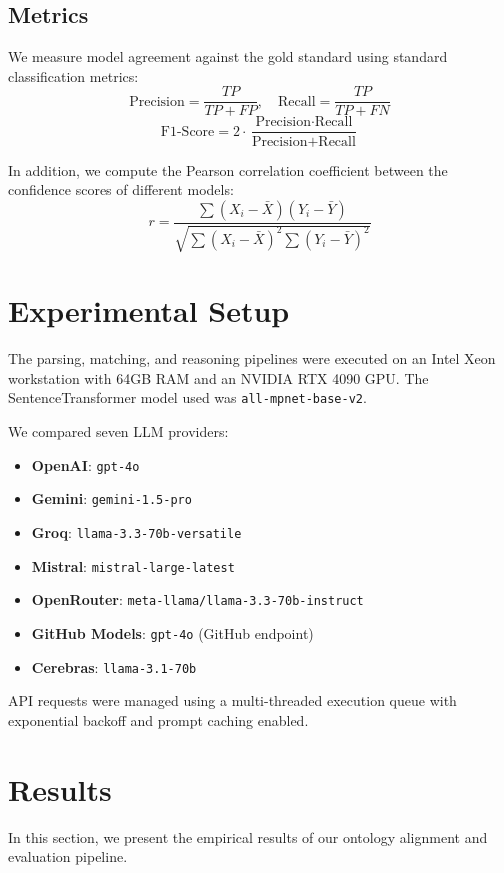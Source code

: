\documentclass[journal,compsoc]{IEEEtran}
\begin{document}
\begin{itemize}
\begin{table}[t]
\begin{itemize}
\subsection{Metrics}
We measure model agreement against the gold standard using standard classification metrics:
\begin{equation}
\text{Precision} = \frac{TP}{TP + FP}, \quad \text{Recall} = \frac{TP}{TP + FN}
\end{equation}
\begin{equation}
\text{F1-Score} = 2 \cdot \frac{\text{Precision} \cdot \text{Recall}}{\text{Precision} + \text{Recall}}
\end{equation}

In addition, we compute the Pearson correlation coefficient between the confidence scores of different models:
\begin{equation}
r = \frac{\sum (X_i - \bar{X})(Y_i - \bar{Y})}{\sqrt{\sum (X_i - \bar{X})^2 \sum (Y_i - \bar{Y})^2}}
\end{equation}

\section{Experimental Setup}
The parsing, matching, and reasoning pipelines were executed on an Intel Xeon workstation with 64GB RAM and an NVIDIA RTX 4090 GPU. The SentenceTransformer model used was \texttt{all-mpnet-base-v2}.

We compared seven LLM providers:
\begin{itemize}
    \item \textbf{OpenAI}: \texttt{gpt-4o}
    \item \textbf{Gemini}: \texttt{gemini-1.5-pro}
    \item \textbf{Groq}: \texttt{llama-3.3-70b-versatile}
    \item \textbf{Mistral}: \texttt{mistral-large-latest}
    \item \textbf{OpenRouter}: \texttt{meta-llama/llama-3.3-70b-instruct}
    \item \textbf{GitHub Models}: \texttt{gpt-4o} (GitHub endpoint)
    \item \textbf{Cerebras}: \texttt{llama-3.1-70b}
\end{itemize}
API requests were managed using a multi-threaded execution queue with exponential backoff and prompt caching enabled.

\section{Results}
In this section, we present the empirical results of our ontology alignment and evaluation pipeline.


\end{itemize}
\end{table}
\end{itemize}
\end{document}
